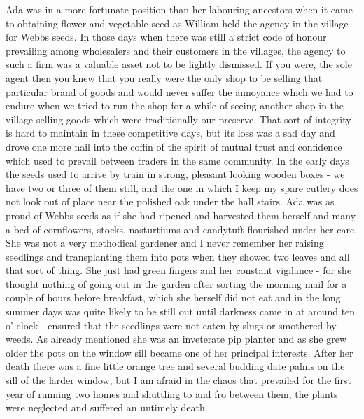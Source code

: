 Ada was in a more fortunate position than her labouring ancestors when it came to obtaining flower and vegetable seed as William held the agency in the village for Webbs seeds. In those days when there was still a strict code of honour prevailing among wholesalers and their customers in the villages, the agency to such a firm was a valuable asset not to be lightly dismissed. If you were, the sole agent then you knew that you really were the only shop to be selling that particular brand of goods and would never suffer the annoyance which we had to endure when we tried to run the shop for a while of seeing another shop in the village selling goods which were traditionally our preserve. That sort of integrity is hard to maintain in these competitive days, but its loss was a sad day and drove one more nail into the coffin of the spirit of mutual trust and confidence which used to prevail between traders in the same community. In the early days the seeds used to arrive by train in strong, pleasant looking wooden boxes - we have two or three of them still, and the one in which I keep my spare cutlery does not look out of place near the polished oak under the hall stairs. Ada was as proud of Webbs seeds as if she had ripened and harvested them herself and many a bed of cornflowers, stocks, nasturtiums and candytuft flourished under her care. She was not a very methodical gardener and I never remember her raising seedlings and transplanting them into pots when they showed two leaves and all that sort of thing. She just had green fingers and her constant vigilance - for she thought nothing of going out in the garden after sorting the morning mail for a couple of hours before breakfast, which she herself did not eat and in the long summer days was quite likely to be still out until darkness came in at around ten o' clock - ensured that the seedlings were not eaten by slugs or smothered by weeds. As already mentioned she was an inveterate pip planter and as she grew older the pots on the window sill became one of her principal interests. After her death there was a fine little orange tree and several budding date palms on the sill of the larder window, but I am afraid in the chaos that prevailed for the first year of running two homes and shuttling to and fro between them, the plants were neglected and suffered an untimely death.

